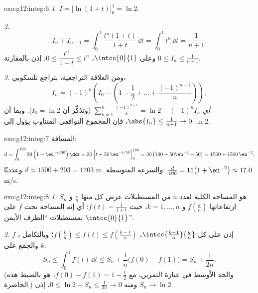 \begin{solution}{exo:g12:integ:6}
\emph{1.} $I = \bigl[\ln(1+t)\bigr]_0^1 = \ln 2$.

\emph{2.}
\[
I_n + I_{n+1} = \int_0^1 \frac{t^n(1 + t)}{1+t}\,\dd t
= \int_0^1 t^n \,\dd t = \frac{1}{n+1}.
\]
وعلى $\intcc{0}{1}$، $0 \leq \dfrac{t^n}{1+t} \leq t^n$، إذن بالمقارنة
$0 \leq I_n \leq \frac{1}{n+1}$.

\emph{3.} ومن العلاقة التراجعية، بتراجع تلسكوبي،
\[
I_n = (-1)^n\left(I_0 - \left(1 - \frac12 + \dots + \frac{(-1)^{n-1}}{n}\right)\right),
\]
\emph{أي}
$\displaystyle\sum_{k=1}^{n} \frac{(-1)^{k-1}}{k} = \ln 2 - (-1)^n I_n$
(وتذكّر أن $I_0 = \ln 2$). وبما أن $\abs{I_n} \leq \frac{1}{n+1} \to 0$، فإن
المجموع التوافقي المتناوب يؤول إلى $\ln 2$.
\end{solution}

\begin{solution}{exo:g12:integ:7}
المسافة:
\[
d = \int_0^{100} 30\left(1 - \eu^{-t/50}\right)\dd t
= 30\left[t + 50\,\eu^{-t/50}\right]_0^{100}
= 30\left(100 + 50\eu^{-2} - 50\right)
= 1500 + 1500\,\eu^{-2}.
\]
وعدديًا $d \approx 1500 + 203 = 1703$ m. والسرعة المتوسطة:
$\frac{d}{100} = 15\bigl(1 + \eu^{-2}\bigr) \approx 17.0$ m/s.
\end{solution}

\begin{solution}{exo:g12:integ:8}
\emph{1.} $S_n$ هو المساحة الكلية لعدد $n$ من المستطيلات عرض كل منها $\frac1n$ و
ارتفاعاتها $f\left(\frac kn\right)$ و $k = 1, \dots, n$، حيث
$f(t) = \frac{1}{1+t}$: أي إنه  المساحة تحت $f$ على $\intcc{0}{1}$
بمستطيلات ``الطرف الأيمن''.

\emph{2.}  $f$ ، إذن على كل 
$\intcc{\frac{k-1}{n}}{\frac kn}$،
$f\left(\frac kn\right) \leq f(t) \leq f\left(\frac{k-1}{n}\right)$؛
وبالتكامل والجمع على $k$:
\[
S_n \leq \int_0^1 f(t)\,\dd t \leq S_n + \frac1n\bigl(f(0) - f(1)\bigr)
= S_n + \frac{1}{2n}.
\]
(والحد الأوسط في عبارة التمرين، مع
$f(0) - f(1) = 1 - \frac12$، هو بالضبط هذه الحاصرة.) ومنه
$0 \leq \ln 2 - S_n \leq \frac{1}{2n} \to 0$، إذن $S_n \to \ln 2$.
\end{solution}

